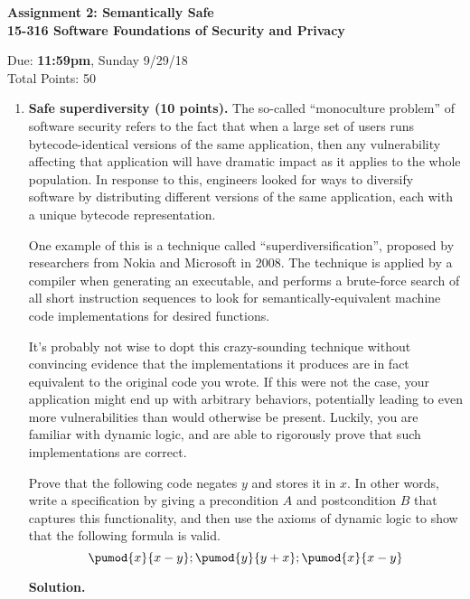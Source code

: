 \documentclass[10pt]{article}
\begin{document}
\begin{center}
\textbf{ Assignment 2: Semantically Safe\\15-316 Software Foundations of Security and Privacy}\\
\end{center}
Due: \textbf{ 11:59pm}, Sunday 9/29/18 \\
Total Points: 50

\vspace{-5mm}

\begin{enumerate}
\item \textbf{Safe superdiversity (10 points).} The so-called ``monoculture problem'' of software security refers to the fact that when a large set of users runs bytecode-identical versions of the same application, then any vulnerability affecting that application will have dramatic impact as it applies to the whole population. In response to this, engineers looked for ways to diversify software by distributing different versions of the same application, each with a unique bytecode representation. 

One example of this is a technique called ``superdiversification'', proposed by researchers from Nokia and Microsoft in 2008. The technique is applied by a compiler when generating an executable, and performs a brute-force search of all short instruction sequences to look for semantically-equivalent machine code implementations for desired functions. 

It's probably not wise to dopt this crazy-sounding technique without convincing evidence that the implementations it produces are in fact equivalent to the original code you wrote. If this were not the case, your application might end up with arbitrary behaviors, potentially leading to even more vulnerabilities than would otherwise be present. Luckily, you are familiar with dynamic logic, and are able to rigorously prove that such implementations are correct.

Prove that the following code negates $y$ and stores it in $x$. In other words, write a specification by giving a precondition $A$ and postcondition $B$ that captures this functionality, and then use the axioms of dynamic logic to show that the following formula is valid.
\[
\pumod{x}{x-y};\pumod{y}{y+x};\pumod{x}{x-y}
\]

\textbf{Solution.}


\newpage


\end{enumerate}
\end{document}
